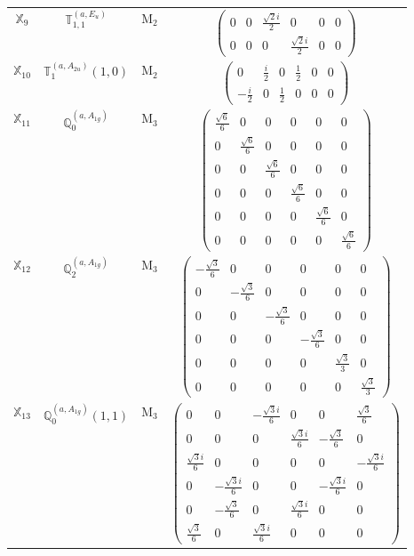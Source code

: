 \documentclass[fleqn,10pt,landscape]{article}
\begin{document}
\begin{itemize}
\begin{center}
\begin{longtable}{c|c|c|c}
$ \mathbb{X}_{9} $ & $\mathbb{T}_{1,1}^{(a,E_{u})}$ & M$_{2}$ & $\begin{pmatrix} 0 & 0 & \frac{\sqrt{2} i}{2} & 0 & 0 & 0 \\ 0 & 0 & 0 & \frac{\sqrt{2} i}{2} & 0 & 0 \end{pmatrix}$ \\
$ \mathbb{X}_{10} $ & $\mathbb{T}_{1}^{(a,A_{2u})}(1,0)$ & M$_{2}$ & $\begin{pmatrix} 0 & \frac{i}{2} & 0 & \frac{1}{2} & 0 & 0 \\ - \frac{i}{2} & 0 & \frac{1}{2} & 0 & 0 & 0 \end{pmatrix}$ \\ \hline
$ \mathbb{X}_{11} $ & $\mathbb{Q}_{0}^{(a,A_{1g})}$ & M$_{3}$ & $\begin{pmatrix} \frac{\sqrt{6}}{6} & 0 & 0 & 0 & 0 & 0 \\ 0 & \frac{\sqrt{6}}{6} & 0 & 0 & 0 & 0 \\ 0 & 0 & \frac{\sqrt{6}}{6} & 0 & 0 & 0 \\ 0 & 0 & 0 & \frac{\sqrt{6}}{6} & 0 & 0 \\ 0 & 0 & 0 & 0 & \frac{\sqrt{6}}{6} & 0 \\ 0 & 0 & 0 & 0 & 0 & \frac{\sqrt{6}}{6} \end{pmatrix}$ \\
$ \mathbb{X}_{12} $ & $\mathbb{Q}_{2}^{(a,A_{1g})}$ & M$_{3}$ & $\begin{pmatrix} - \frac{\sqrt{3}}{6} & 0 & 0 & 0 & 0 & 0 \\ 0 & - \frac{\sqrt{3}}{6} & 0 & 0 & 0 & 0 \\ 0 & 0 & - \frac{\sqrt{3}}{6} & 0 & 0 & 0 \\ 0 & 0 & 0 & - \frac{\sqrt{3}}{6} & 0 & 0 \\ 0 & 0 & 0 & 0 & \frac{\sqrt{3}}{3} & 0 \\ 0 & 0 & 0 & 0 & 0 & \frac{\sqrt{3}}{3} \end{pmatrix}$ \\
$ \mathbb{X}_{13} $ & $\mathbb{Q}_{0}^{(a,A_{1g})}(1,1)$ & M$_{3}$ & $\begin{pmatrix} 0 & 0 & - \frac{\sqrt{3} i}{6} & 0 & 0 & \frac{\sqrt{3}}{6} \\ 0 & 0 & 0 & \frac{\sqrt{3} i}{6} & - \frac{\sqrt{3}}{6} & 0 \\ \frac{\sqrt{3} i}{6} & 0 & 0 & 0 & 0 & - \frac{\sqrt{3} i}{6} \\ 0 & - \frac{\sqrt{3} i}{6} & 0 & 0 & - \frac{\sqrt{3} i}{6} & 0 \\ 0 & - \frac{\sqrt{3}}{6} & 0 & \frac{\sqrt{3} i}{6} & 0 & 0 \\ \frac{\sqrt{3}}{6} & 0 & \frac{\sqrt{3} i}{6} & 0 & 0 & 0 \end{pmatrix}$ \\

\end{longtable}
\end{center}
\end{itemize}
\end{document}
